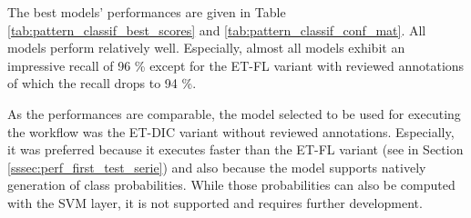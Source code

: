 The best models' performances are given in Table \ref{tab:pattern_classif_best_scores} and \ref{tab:pattern_classif_conf_mat}. All models perform relatively well. Especially, almost all models exhibit an impressive recall of 96 \% except for the ET-FL variant with reviewed annotations of which the recall drops to 94 \%.

As the performances are comparable, the model selected to be used for executing the workflow was the ET-DIC variant without reviewed annotations. Especially, it was preferred because it executes faster than the ET-FL variant (see in Section \ref{sssec:perf_first_test_serie}) and also because the model supports natively generation of class probabilities. While those probabilities can also be computed with the SVM layer, it is not supported and requires further development. 

\begin{table}
	\small
	\center
	\caption{Pattern classifier. Dataset size.}
	\label{tab:pattern_classif_dataset_size}
\end{table}


